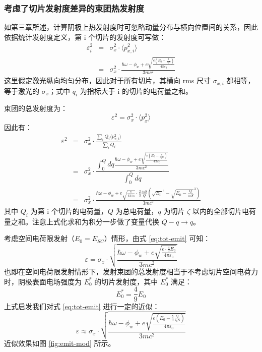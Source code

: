 \subsubsection{考虑了切片发射度差异的束团热发射度}
如第三章所述，计算阴极上热发射度时可忽略动量分布与横向位置间的关系，因此依据统计发射度定义，第 i 个切片的发射度可写做：
\begin{eqnarray*}
\varepsilon_i^2 &=& \sigma_x^2\cdot\langle p_{x,i}^2\rangle \\
&=& \sigma_x^2\cdot\frac{\hbar\omega-\phi_w+e\sqrt{\frac{e\left(E_0-\frac{q_i}{\varepsilon_0 S}\right)}{4\pi\varepsilon_0}}}{3mc^2}
\end{eqnarray*}
这里假定激光纵向均匀分布，因此对于所有切片，其横向 rms 尺寸 $\sigma_{x,i}$ 都相等，等于激光的 $\sigma_{x}$；式中 $q_i$ 为指标大于 i 的切片的电荷量之和。

束团的总发射度为：
\[
\varepsilon^2 = \sigma_x^2\cdot\langle p_{x}^2\rangle
\]
因此有：
\begin{eqnarray}
\varepsilon^2 &=& \sigma_x^2\cdot\frac{\sum\limits_i Q_i\langle p_{x,i}^2\rangle}{\sum\limits_iQ_i} \label{eq:tot-emit-orig}\\
&=& \sigma_x^2\cdot\dfrac{\displaystyle\int_0^{Q}dq\frac{\hbar\omega-\phi_w+e\sqrt{\frac{e\left(E_0-\frac{q}{\varepsilon_0 S}\right)}{4\pi\varepsilon_0}}}{3mc^2}}{\displaystyle\int_0^{Q}dq}\nonumber\\
&=&\sigma_x^2\cdot\frac{\hbar\omega-\phi_w+e\sqrt{\frac{e}{4\pi\varepsilon_0}}\cdot\frac{2}{3}\frac{\varepsilon_0 S}{Q}\left(\sqrt{E_0}^3-\sqrt{E_0-\frac{Q}{\varepsilon_0 S}}^3\right)}{3mc^2}
\label{eq:tot-emit}
\end{eqnarray}
其中 $Q_i$ 为第 i 个切片的电荷量，$Q$ 为总电荷量，$q$ 为切片 $\zeta$ 以内的全部切片电荷量之和。注意上式化求和为积分一步做了变量代换 $Q-q \to q$。

考虑空间电荷限发射（$E_0=E_{SC}$）情形，由式 \ref{eq:tot-emit} 可知：
\begin{equation}
\varepsilon = \sigma_x\cdot\sqrt{\frac{\hbar\omega-\phi_w+e\sqrt{\frac{e\cdot\frac{4}{9}E_0}{4\pi\varepsilon_0}}}{3mc^2}}
\end{equation}
也即在空间电荷限发射情形下，发射束团的总发射度相当于不考虑切片空间电荷力时，阴极表面电场强度为 $E_0^*$ 的切片发射度，其中 $E_0^*$ 满足：
\begin{equation}
E_0^*=\frac{4}{9}E_0
\end{equation}
上式启发我们对式 \ref{eq:tot-emit} 进行一定的近似：
\begin{equation}
\varepsilon \approx \sigma_x\cdot\sqrt{\frac{\hbar\omega-\phi_w+e\sqrt{\frac{e\left(E_0-\frac{5}{9}\frac{Q}{\varepsilon_0 S}\right)}{4\pi\varepsilon_0}}}{3mc^2}}
\label{eq:tot-emit-approx}
\end{equation}
近似效果如图 \ref{fig:emit-mod} 所示。


